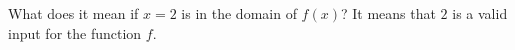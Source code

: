 {What does it mean if $x=2$ is in the domain of $f(x)$?}
{It means that $2$ is a valid input for the function $f$.}

